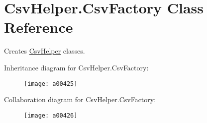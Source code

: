 \hypertarget{a00067}{\section{Csv\-Helper.\-Csv\-Factory Class Reference}
\label{a00067}
}


Creates \hyperlink{a00340}{Csv\-Helper} classes.  




Inheritance diagram for Csv\-Helper.\-Csv\-Factory\-:
\nopagebreak
\begin{figure}[H]
\begin{center}
\leavevmode
\texttt{[image: a00425]}
\end{center}
\end{figure}


Collaboration diagram for Csv\-Helper.\-Csv\-Factory\-:
\nopagebreak
\begin{figure}[H]
\begin{center}
\leavevmode
\texttt{[image: a00426]}
\end{center}
\end{figure}
